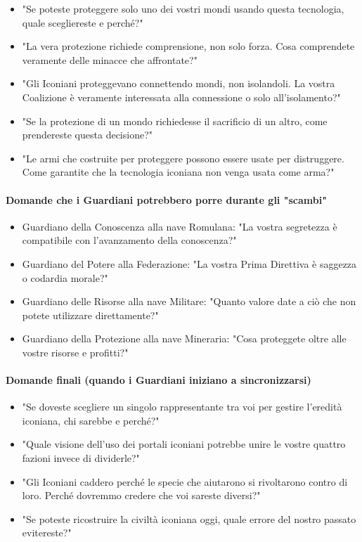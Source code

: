 \documentclass[letterpaper,twocolumn,openany,nodeprecatedcode]{dndbook}
\begin{document}
\begin{itemize}
    \item "Se poteste proteggere solo uno dei vostri mondi usando questa tecnologia, quale scegliereste e perché?"
    \item "La vera protezione richiede comprensione, non solo forza. Cosa comprendete veramente delle minacce che affrontate?"
    \item "Gli Iconiani proteggevano connettendo mondi, non isolandoli. La vostra Coalizione è veramente interessata alla connessione o solo all'isolamento?"
    \item "Se la protezione di un mondo richiedesse il sacrificio di un altro, come prendereste questa decisione?"
    \item "Le armi che costruite per proteggere possono essere usate per distruggere. Come garantite che la tecnologia iconiana non venga usata come arma?"
\end{itemize}

\paragraph{Domande che i Guardiani potrebbero porre durante gli "scambi"}

\begin{itemize}
    \item Guardiano della Conoscenza alla nave Romulana: "La vostra segretezza è compatibile con l'avanzamento della conoscenza?"
    \item Guardiano del Potere alla Federazione: "La vostra Prima Direttiva è saggezza o codardia morale?"
    \item Guardiano delle Risorse alla nave Militare: "Quanto valore date a ciò che non potete utilizzare direttamente?"
    \item Guardiano della Protezione alla nave Mineraria: "Cosa proteggete oltre alle vostre risorse e profitti?"
\end{itemize}

\paragraph{Domande finali (quando i Guardiani iniziano a sincronizzarsi)}

\begin{itemize}
    \item "Se doveste scegliere un singolo rappresentante tra voi per gestire l'eredità iconiana, chi sarebbe e perché?"
    \item "Quale visione dell'uso dei portali iconiani potrebbe unire le vostre quattro fazioni invece di dividerle?"
    \item "Gli Iconiani caddero perché le specie che aiutarono si rivoltarono contro di loro. Perché dovremmo credere che voi sareste diversi?"
    \item "Se poteste ricostruire la civiltà iconiana oggi, quale errore del nostro passato evitereste?"
\end{itemize}
\end{document}
